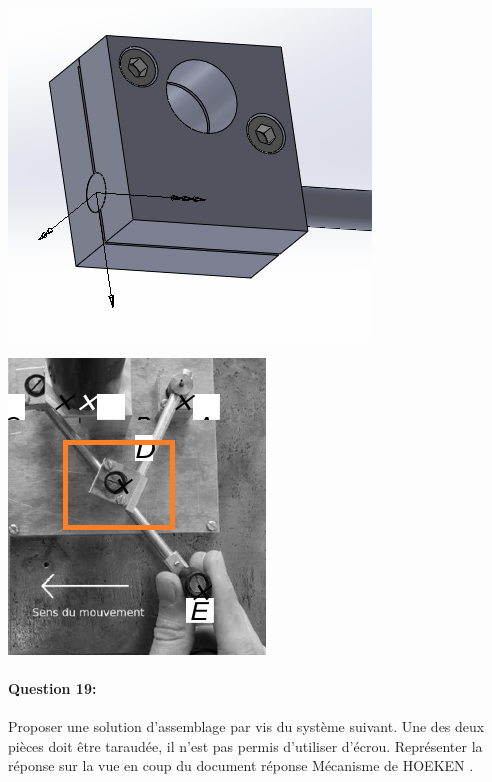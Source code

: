 \begin{minipage}{0.45\linewidth}
	\includegraphics[width=0.7\linewidth]{img/Figure20}
\end{minipage}\hfill
\begin{minipage}{0.45\linewidth}
	\includegraphics[width=0.7\linewidth]{img/Figure21}
\end{minipage}

\paragraph{Question 19:} Proposer une solution d'assemblage par vis du système suivant. Une des deux pièces doit être taraudée, il n'est pas permis d'utiliser d'écrou. Représenter la réponse sur la vue en coup du document réponse \og Mécanisme de HOEKEN \fg.



